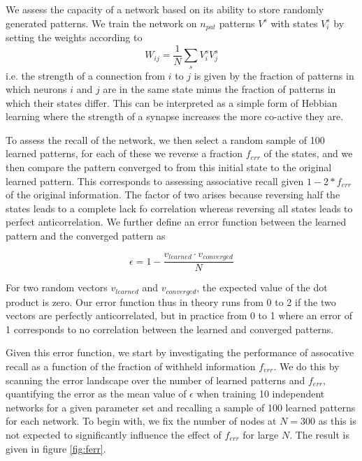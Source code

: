 \documentclass{article}
\begin{document}
We assess the capacity of a network based on its ability to store randomly generated patterns. We train the network on $n_{pat}$ patterns $V^s$ with states $V^s_i$ by setting the weights according to
\begin{equation}
W_{ij} = \dfrac{1}{N} \sum_s{V_i^s V_j^s}
\end{equation}
i.e. the strength of a connection from $i$ to $j$ is given by the fraction of patterns in which neurons $i$ and $j$ are in the same state minus the fraction of patterns in which their states differ. This can be interpreted as a simple form of Hebbian learning where the strength of a synapse increases the more co-active they are.

To assess the recall of the network, we then select a random sample of 100 learned patterns, for each of these we reverse a fraction $f_{err}$ of the states, and we then compare the pattern converged to from this initial state to the original learned pattern. This corresponds to assessing associative recall given $1-2*f_{err}$ of the original information. The factor of two arises because reversing half the states leads to a complete lack fo correlation whereas reversing all states leads to perfect anticorrelation. We further define an error function between the learned pattern and the converged pattern as 

\begin{equation}
\epsilon = 1 - \dfrac{v_{learned}\cdot v_{converged}}{N}
\end{equation}

For two random vectors $v_{learned}$ and $v_{converged}$, the expected value of the dot product is zero. Our error function thus in theory runs from 0 to 2 if the two vectors are perfectly anticorrelated, but in practice from 0 to 1 where an error of 1 corresponds to no correlation between the learned and converged patterns.

Given this error function, we start by investigating the performance of assocative recall as a function of the fraction of withheld information $f_{err}$. We do this by scanning the error landscape over the number of learned patterns and $f_{err}$, quantifying the error as the mean value of $\epsilon$ when training 10 independent networks for a given parameter set and recalling a sample of 100 learned patterns for each network.
To begin with, we fix the number of nodes at $N = 300$ as this is not expected to significantly influence the effect of $f_{err}$ for large $N$. The result is given in figure \ref{fig:ferr}.
\end{document}
